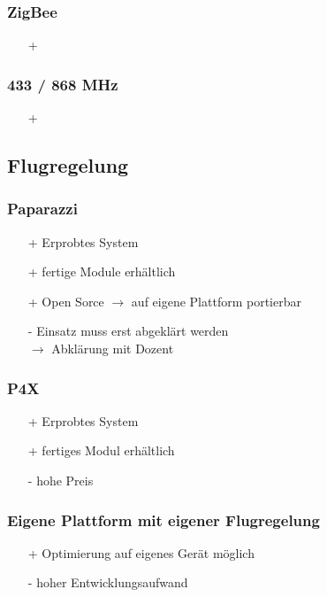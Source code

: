 \subsubsection{ZigBee}
\begin{itemize}
    \item[+] ~
\end{itemize}

\subsubsection{433 / 868 MHz}
\begin{itemize}
    \item[+] ~
\end{itemize}

\subsection{Flugregelung}

\subsubsection{Paparazzi}
\begin{itemize}
    \item[+] Erprobtes System
    \item[+] fertige Module erhältlich
    \item[+] Open Sorce $\to$ auf eigene Plattform portierbar
    \item[-] Einsatz muss erst abgeklärt werden \\
        $\to$ Abklärung mit Dozent
\end{itemize}

\subsubsection{P4X}
\begin{itemize}
    \item[+] Erprobtes System
    \item[+] fertiges Modul erhältlich
    \item[-] hohe Preis
\end{itemize}

\subsubsection{Eigene Plattform mit eigener Flugregelung}
\begin{itemize}
    \item[+] Optimierung auf eigenes Gerät möglich
    \item[-] hoher Entwicklungsaufwand
\end{itemize}

